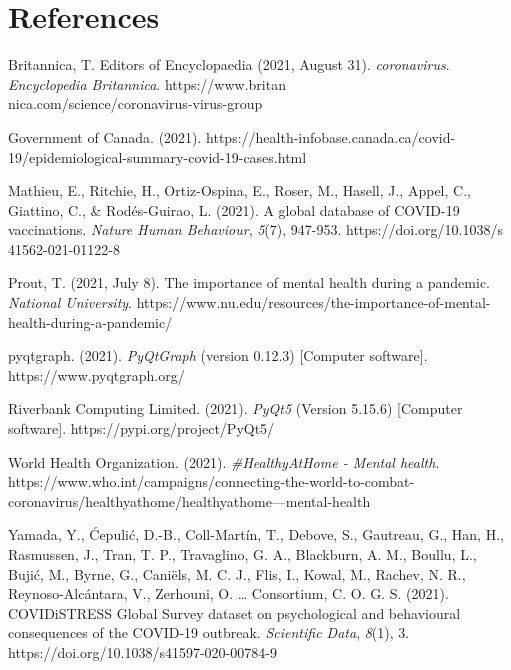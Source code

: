 \documentclass[fontsize=11pt]{article}
\begin{document}
    \section*{References}


    \hangindent=0.7cm
    Britannica, T. Editors of Encyclopaedia (2021, August 31). \textit{coronavirus}. \textit{Encyclopedia Britannica}. https://www.britan\\nica.com/science/coronavirus-virus-group

    \hangindent=0.7cm \noindent
    Government of Canada. (2021). https://health-infobase.canada.ca/covid-19/epidemiological-summary-covid-19-cases.html

    \hangindent=0.7cm \noindent
    Mathieu, E., Ritchie, H., Ortiz-Ospina, E., Roser, M., Hasell, J., Appel, C., Giattino, C., \& Rodés-Guirao, L. (2021). A global database of COVID-19 vaccinations. \textit{Nature Human Behaviour}, \textit{5}(7), 947-953. https://doi.org/10.1038/s\\41562-021-01122-8

    \hangindent=0.7cm \noindent
    Prout, T. (2021, July 8). The importance of mental health during a pandemic. \textit{National University}. https://www.nu.edu/resources/the-importance-of-mental-health-during-a-pandemic/

    \hangindent=0.7cm \noindent
    pyqtgraph. (2021). \textit{PyQtGraph} (version 0.12.3) [Computer software]. https://www.pyqtgraph.org/

    \hangindent=0.7cm \noindent
    Riverbank Computing Limited. (2021). \textit{PyQt5} (Version 5.15.6) [Computer software]. https://pypi.org/project/PyQt5/

    \hangindent=0.7cm \noindent
    World Health Organization. (2021). \textit{\#HealthyAtHome - Mental health}. https://www.who.int/campaigns/connecting-the-world-to-combat-coronavirus/healthyathome/healthyathome---mental-health

    \hangindent=0.7cm \noindent
    Yamada, Y., Ćepulić, D.-B., Coll-Martín, T., Debove, S., Gautreau, G., Han, H., Rasmussen, J., Tran, T. P., Travaglino, G. A., Blackburn, A. M., Boullu, L., Bujić, M., Byrne, G., Caniëls, M. C. J., Flis, I., Kowal, M., Rachev, N. R., Reynoso-Alcántara, V., Zerhouni, O. … Consortium, C. O. G. S. (2021). COVIDiSTRESS Global Survey dataset on psychological and behavioural consequences of the COVID-19 outbreak. \textit{Scientific Data}, \textit{8}(1), 3. https://doi.org/10.1038/s41597-020-00784-9
\end{document}
